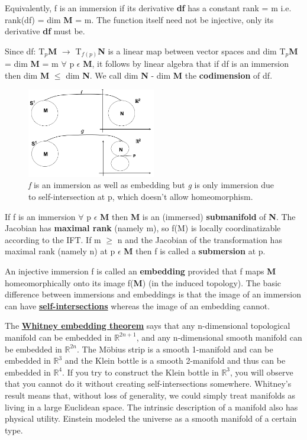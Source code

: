 Equivalently, f is an immersion if its derivative \textbf{df} has a constant rank = m i.e. rank(df) = dim \textbf{M} = m.
The function itself need not be injective, only its derivative \textbf{df} must be.

Since df: T$_p$\textbf{M} $\rightarrow$ T$_{f(p)}$\textbf{N} is a linear map between vector spaces
and dim T$_p$\textbf{M} = dim \textbf{M} = m $\forall$ p $\epsilon$ \textbf{M}, 
it follows by linear algebra that if df is an immersion then dim \textbf{M} $\leq$ dim \textbf{N}. 
We call dim \textbf{N} - dim \textbf{M} the \textbf{codimension} of df.
\begin{figure}[h]
    \begin{center}
        \includegraphics[width=0.5\textwidth]{figures/embedding-immersion.png}
        \caption{\textit{f} is an immersion as well as embedding but \textit{g} is only immersion due to self-intersection at p, which doesn't allow homeomorphism.}
    \end{center}
\end{figure}

If f is an immersion $\forall$ p $\epsilon$ \textbf{M} then \textbf{M} is an (immersed) \textbf{submanifold} of \textbf{N}.
The Jacobian has \textbf{maximal rank} (namely m), so f(M) is locally coordinatizable according to the IFT. 
If m $\geq$ n and the Jacobian of the transformation has maximal rank (namely n) at p $\epsilon$ \textbf{M} then f is called a
\textbf{submersion} at p.

An injective immersion f is called an \textbf{embedding} provided
that f maps \textbf{M} homeomorphically onto its image f(\textbf{M}) (in the induced topology). 
The basic difference between immersions and embeddings is that the image
of an immersion can have \href{https://en.wikipedia.org/wiki/List_of_self-intersecting_polygons}{\textbf{self-intersections}} 
whereas the image of an embedding cannot. 

The \href{https://en.wikipedia.org/wiki/Whitney_embedding_theorem}{\textbf{Whitney embedding theorem}} says that
any n-dimensional topological manifold can be embedded in $\mathbb{R}^{2n+1}$, and any n-dimensional smooth manifold can be embedded in $\mathbb{R}^{2n}$.
The  Möbius strip is a smooth 1-manifold and can be embedded in $\mathbb{R}^{3}$ and 
the Klein bottle is a smooth 2-manifold and thus can be embedded in $\mathbb{R}^{4}$. 
If you try to construct the Klein bottle in $\mathbb{R}^{3}$, 
you will observe that you cannot do it without creating self-intersections somewhere.
Whitney's result means that, without loss of generality, we could simply treat
manifolds as living in a large Euclidean space. The intrinsic description of a manifold also has physical utility. Einstein modeled
the universe as a smooth manifold of a certain type.

